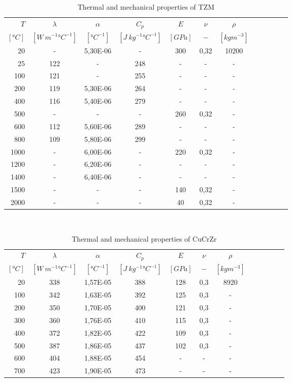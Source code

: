 \begin{table}\centering
    \begin{tabular}{@{}rccccccccccc@{}}\toprule
    $T$ & $\lambda$ & $\alpha$ & $C_p$ & $E$ & $\nu$ & $\rho$\\
    \cmidrule{1-7}
    $[\si{\degree} C]$ & $[W \ m^{-1} \si{\degree} C^{-1}]$ & $[\si{\degree} C^{-1}]$ & $[J \ kg^{-1} \si{\degree} C^{-1}]$ & $[GPa]$ & $-$ & $[kg m^{-3}]$\\
    \midrule
    20&-&5,30E-06&-&300&0,32&10200\\
    25&122&-&248&-&-&-\\
    100&121&-&255&-&-&-\\
    200&119&5,30E-06&264&-&-&-\\
    400&116&5,40E-06&279&-&-&-\\
    500&-&-&-&260 &0,32&-\\
    600&112&5,60E-06&289&-&-&-\\
    800&109&5,80E-06&299&-&-&-\\
    1000&-& 6,00E-06&-& 220 &0,32&-\\
    1200&-& 6,20E-06&-&-&-&-\\
    1400&-& 6,40E-06&-&-&-&-\\
    1500&-&-&-&140&0,32&-\\
    2000&-&-&-&40&0,32&-\\
\bottomrule
\end{tabular}
\caption{Thermal and mechanical properties of \acrlong{TZM}}
\end{table}
\\
\begin{table}\centering
    \begin{tabular}{@{}rccccccccccc@{}}\toprule
    $T$ & $\lambda$ & $\alpha$ & $C_p$ & $E$ & $\nu$ & $\rho$\\
    \cmidrule{1-7}
    $[\si{\degree} C]$ & $[W \ m^{-1} \si{\degree} C^{-1}]$ & $[\si{\degree} C^{-1}]$ & $[J \ kg^{-1} \si{\degree} C^{-1}]$ & $[GPa]$ & $-$ & $[kg m^{-3}]$\\
    \midrule
    20 & 338 & 1,57E-05 & 388 & 128 & 0,3 & 8920 \\
    100 & 342 & 1,63E-05 & 392 & 125 & 0,3 & - \\
    200 & 350 & 1,70E-05 & 400 & 121 & 0,3 & - \\
    300 & 360 & 1,76E-05 & 410 & 115 & 0,3 & - \\
    400 & 372 & 1,82E-05 & 422 & 109 & 0,3 & - \\
    500 & 387 & 1,86E-05 & 437 & 102 & 0,3 & - \\
    600 & 404 & 1,88E-05 & 454 & - & - & - \\
    700 & 423 & 1,90E-05 & 473 & - & - & - \\
\bottomrule
\end{tabular}
\caption{Thermal and mechanical properties of \acrlong{CuCrZr}}
\end{table}
